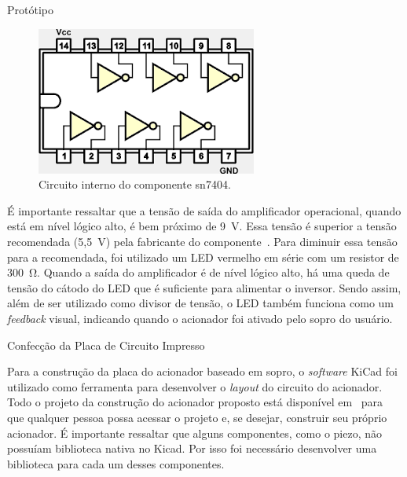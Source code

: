 \begin{chapter}{Protótipo}
\begin{figure}[!h]
	\centering
	\begin{minipage}[c]{\textwidth}
	\centering
	\includegraphics[width=0.45\linewidth]{fig/sn7404}
	\caption{Circuito interno do componente sn7404.}
	\label{fig:sn7404}
	\end{minipage}
\end{figure} 

É importante ressaltar que a tensão de saída do amplificador operacional, quando
está em nível lógico alto, é bem próximo de 9~V. Essa tensão é superior a tensão
recomendada (5,5~V) pela fabricante do componente~\cite{7404}.  Para diminuir
essa tensão para a recomendada, foi utilizado um LED vermelho em série com um
resistor de 300~\si{\ohm}. Quando a saída do amplificador é de nível lógico
alto, há uma queda de tensão do cátodo do LED que é suficiente para alimentar o
inversor. Sendo assim, além de ser utilizado como divisor de tensão, o LED
também funciona como um \textit{feedback} visual, indicando quando o acionador
foi ativado pelo sopro do usuário.  


\begin{section}{Confecção da Placa de Circuito Impresso}

Para a construção da placa do acionador baseado em sopro, o \textit{software}
KiCad foi utilizado como ferramenta para desenvolver o \textit{layout} do
circuito do acionador. Todo o projeto da construção do acionador proposto está
disponível em~\cite{ErickGit} para que qualquer pessoa possa acessar o projeto
e, se desejar, construir seu próprio acionador. É importante ressaltar que
alguns componentes, como o piezo, não possuíam biblioteca nativa no Kicad. Por
isso foi necessário desenvolver uma biblioteca para cada um desses componentes.


\end{section}
\end{chapter}
